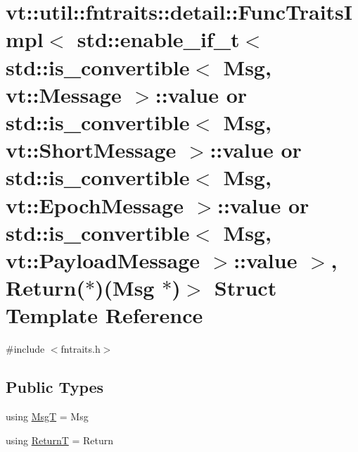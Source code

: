 \hypertarget{structvt_1_1util_1_1fntraits_1_1detail_1_1_func_traits_impl_3_01std_1_1enable__if__t_3_01std_1_1b349e1ada243fe46f9d4e2c71aace5b1}{}\section{vt\+:\+:util\+:\+:fntraits\+:\+:detail\+:\+:Func\+Traits\+Impl$<$ std\+:\+:enable\+\_\+if\+\_\+t$<$ std\+:\+:is\+\_\+convertible$<$ Msg, vt\+:\+:Message $>$\+:\+:value or std\+:\+:is\+\_\+convertible$<$ Msg, vt\+:\+:Short\+Message $>$\+:\+:value or std\+:\+:is\+\_\+convertible$<$ Msg, vt\+:\+:Epoch\+Message $>$\+:\+:value or std\+:\+:is\+\_\+convertible$<$ Msg, vt\+:\+:Payload\+Message $>$\+:\+:value $>$, Return($\ast$)(Msg $\ast$)$>$ Struct Template Reference}
\label{structvt_1_1util_1_1fntraits_1_1detail_1_1_func_traits_impl_3_01std_1_1enable__if__t_3_01std_1_1b349e1ada243fe46f9d4e2c71aace5b1}


{\ttfamily \#include $<$fntraits.\+h$>$}

\subsection*{Public Types}
\begin{DoxyCompactItemize}
\item 
using \hyperlink{structvt_1_1util_1_1fntraits_1_1detail_1_1_func_traits_impl_3_01std_1_1enable__if__t_3_01std_1_1b349e1ada243fe46f9d4e2c71aace5b1_a03b2488c4a36cb1012dbda300c316444}{MsgT} = Msg
\item 
using \hyperlink{structvt_1_1util_1_1fntraits_1_1detail_1_1_func_traits_impl_3_01std_1_1enable__if__t_3_01std_1_1b349e1ada243fe46f9d4e2c71aace5b1_a83a401d485de319f8eef7da787dbf55f}{ReturnT} = Return
\end{DoxyCompactItemize}
